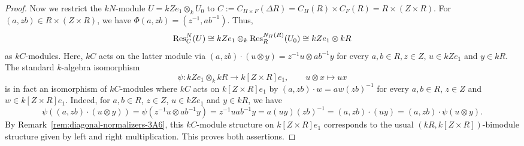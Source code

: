 \begin{proof}
    Now we restrict the $kN$-module $U=kZe_1\otimes_k U_0$ to $C:=C_{H\times F}(\Delta R)=C_H(R)\times C_F(R)=R\times (Z\times R)$. For $(a,zb)\in R\times (Z\times R)$, we have $\Phi(a,zb)=(z^{-1}, ab^{-1})$. Thus,
    \[
    \operatorname{Res}^N_C(U)\cong kZe_1\otimes_k \operatorname{Res}^{N_H(R)}_R(U_0)\cong kZe_1\otimes kR
    \]
    as $kC$-modules. Here, $kC$ acts on the latter module via $(a,zb)\cdot (u\otimes y)=z^{-1}u\otimes ab^{-1}y$ for every $a,b\in R, z\in Z$, $u\in kZe_1$ and $y\in kR$. The standard $k$-algebra isomorphism
    \[
    \psi:kZe_1\otimes_k kR\longrightarrow k[Z\times R]e_1, \qquad u\otimes x\mapsto ux
    \]
    is in fact an isomorphism of $kC$-modules where $kC$ acts on $k[Z\times R]e_1$ by $(a,zb)\cdot w=aw(zb)^{-1}$ for every $a,b\in R$, $z\in Z$ and $w\in k[Z\times R]e_1$. Indeed, for $a,b\in R$, $z\in Z$, $u\in kZe_1$ and $y\in kR$, we have
    \[
    \psi((a,zb)\cdot (u\otimes y))\!=\psi(z^{-1}u\otimes ab^{-1}y)=z^{-1}uab^{-1}y=a(uy)(zb)^{-1}\!=(a,zb)\cdot (uy)=(a,zb)\cdot\psi(u\otimes y).
    \]
    By Remark~\ref{rem:diagonal-normalizers-3A6}, this $kC$-module structure on $k[Z\times R]e_1$ corresponds to the usual $(kR, k[Z\times R])$-bimodule structure given by left and right multiplication. This proves both assertions.
    \end{proof}

